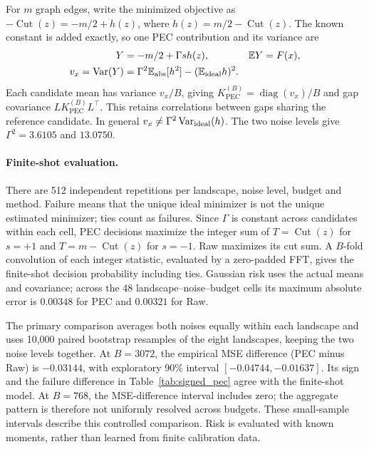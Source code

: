 \documentclass[a4paper,onecolumn,unpublished,nopdfoutputerror]{quantumarticle}
\theoremstyle{plain}
\theoremstyle{definition}
\newcommand{\E}{\mathbb{E}}
\newcommand{\Var}{\operatorname{Var}}
\newcommand{\diag}{\operatorname{diag}}
\newcommand{\PEC}{\mathrm{PEC}}
\newcommand{\1}{\mathbf{1}}
\begin{document}
For $m$ graph edges, write the minimized objective as $-\operatorname{Cut}(z)=-m/2+h(z)$, where $h(z)=m/2-\operatorname{Cut}(z)$. The known constant is added exactly, so one PEC contribution and its variance are
\begin{align}
Y&=-m/2+\Gamma s h(z), & \E Y&=F(x),\label{eq:pec_centered_estimator}\\
v_x=\Var(Y)&=\Gamma^2\E_{\rm abs}[h^2]-(\E_{\rm ideal}h)^2.\label{eq:pec_signed_variance}
\end{align}
Each candidate mean has variance $v_x/B$, giving $K_{\PEC}^{(B)}=\diag(v_x)/B$ and gap covariance $LK_{\PEC}^{(B)}L^\top$. This retains correlations between gaps sharing the reference candidate. In general $v_x\ne\Gamma^2\Var_{\rm ideal}(h)$. The two noise levels give $\Gamma^2=3.6105$ and $13.0750$.

\paragraph{Finite-shot evaluation.}
There are 512 independent repetitions per landscape, noise level, budget and method. Failure means that the unique ideal minimizer is not the unique estimated minimizer; ties count as failures. Since $\Gamma$ is constant across candidates within each cell, PEC decisions maximize the integer sum of $T=\operatorname{Cut}(z)$ for $s=+1$ and $T=m-\operatorname{Cut}(z)$ for $s=-1$. Raw maximizes its cut sum. A $B$-fold convolution of each integer statistic, evaluated by a zero-padded FFT, gives the finite-shot decision probability including ties. Gaussian risk uses the actual means and covariance; across the 48 landscape--noise--budget cells its maximum absolute error is $0.00348$ for PEC and $0.00321$ for Raw.

The primary comparison averages both noises equally within each landscape and uses 10,000 paired bootstrap resamples of the eight landscapes, keeping the two noise levels together. At $B=3072$, the empirical MSE difference (PEC minus Raw) is $-0.03144$, with exploratory 90\% interval $[-0.04744,-0.01637]$. Its sign and the failure difference in Table~\ref{tab:signed_pec} agree with the finite-shot model. At $B=768$, the MSE-difference interval includes zero; the aggregate pattern is therefore not uniformly resolved across budgets. These small-sample intervals describe this controlled comparison. Risk is evaluated with known moments, rather than learned from finite calibration data.
\end{document}
